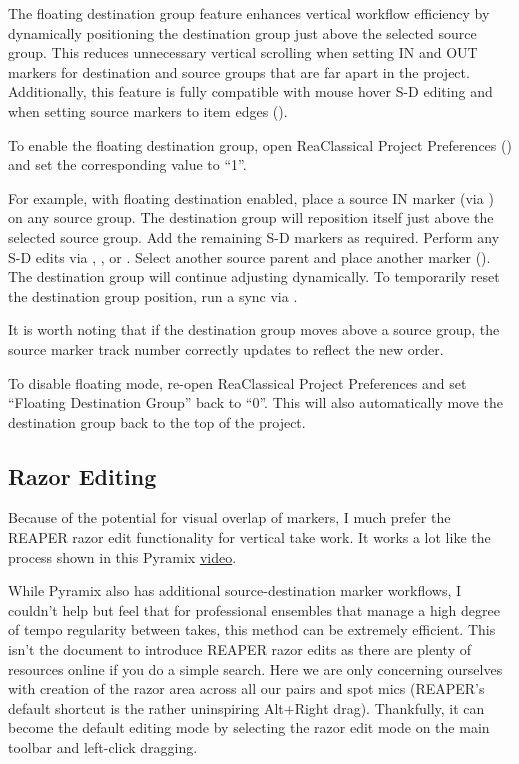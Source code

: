 \documentclass[10pt,american]{article}
\begin{document}
The floating destination group feature enhances vertical workflow efficiency by
dynamically positioning the destination group just above the selected source
group. This reduces unnecessary vertical scrolling when setting IN and OUT
markers for destination and source groups that are far apart in the project.
Additionally, this feature is fully compatible with mouse hover S-D editing and
when setting source markers to item edges ().

To enable the floating destination group, open ReaClassical Project Preferences
() and set the corresponding value to ``1''.

For example, with floating destination enabled, place a source IN marker (via
) on any source group. The destination group will reposition itself just
above the selected source group. Add the remaining S-D markers as required.
Perform any S-D edits via , , or . Select another
source parent and place another marker (). The destination group will
continue adjusting dynamically. To temporarily reset the destination group
position, run a sync via .

It is worth noting that if the destination group moves above a source group, the
source marker track number correctly updates to reflect the new order. 

To disable floating mode, re-open ReaClassical Project Preferences and set
``Floating Destination Group'' back to ``0''. This will also automatically move
the destination group back to the top of the project.

\subsection{Razor Editing}

Because of the potential for visual overlap of markers, I much prefer the REAPER
razor edit functionality for vertical take work. It works a lot like the process
shown in this Pyramix \href{https://www.youtube.com/watch?v=wQXwnvITQCQ}{video}.

While Pyramix also has additional source-destination marker workflows, I
couldn't help but feel that for professional ensembles that manage a high degree
of tempo regularity between takes, this method can be extremely efficient. This
isn't the document to introduce REAPER razor edits as there are plenty of
resources online if you do a simple search. Here we are only concerning
ourselves with creation of the razor area across all our pairs and spot mics
(REAPER's default shortcut is the rather uninspiring Alt+Right drag).
Thankfully, it can become the default editing mode by selecting the razor edit
mode on the main toolbar and left-click dragging. 
\end{document}
